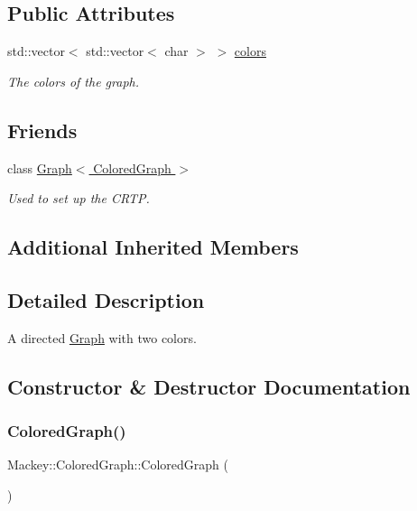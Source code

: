 \subsection*{Public Attributes}
\begin{DoxyCompactItemize}
\item 
std\+::vector$<$ std\+::vector$<$ char $>$ $>$ \hyperlink{classMackey_1_1ColoredGraph_a29fbdcaf9f94f0f5d48e5390ba49b338}{colors}
\begin{DoxyCompactList}\small\item\em The colors of the graph. \end{DoxyCompactList}\end{DoxyCompactItemize}
\subsection*{Friends}
\begin{DoxyCompactItemize}
\item 
class \hyperlink{classMackey_1_1ColoredGraph_a2debfc8158c19d7b93550156a3e2676a}{Graph$<$ Colored\+Graph $>$}
\begin{DoxyCompactList}\small\item\em Used to set up the C\+R\+TP. \end{DoxyCompactList}\end{DoxyCompactItemize}
\subsection*{Additional Inherited Members}


\subsection{Detailed Description}
A directed \hyperlink{classMackey_1_1Graph}{Graph} with two colors. 

\subsection{Constructor \& Destructor Documentation}
\mbox{\label{classMackey_1_1ColoredGraph_a367055b4a615119cc767a738f6e9e719}} 
\subsubsection{\texorpdfstring{Colored\+Graph()}{ColoredGraph()}\hspace{0.1cm}{\footnotesize\ttfamily [1/2]}}
{\footnotesize\ttfamily Mackey\+::\+Colored\+Graph\+::\+Colored\+Graph (\begin{DoxyParamCaption}{ }\end{DoxyParamCaption})\hspace{0.3cm}{\ttfamily [inline]}}



